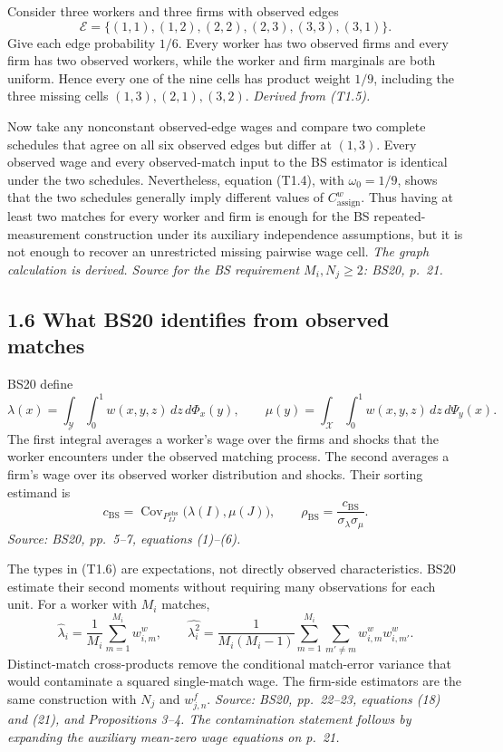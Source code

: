 \documentclass[11pt]{article}
\begin{document}
Consider three workers and three firms with observed edges
\[
\mathcal E
=\{(1,1),(1,2),(2,2),(2,3),(3,3),(3,1)\}.
\tag{T1.5}
\]
Give each edge probability \(1/6\).  Every worker has two observed firms and
every firm has two observed workers, while the worker and firm marginals are
both uniform.  Hence every one of the nine cells has product weight \(1/9\),
including the three missing cells \((1,3),(2,1),(3,2)\).
\textit{Derived from (T1.5).}

Now take any nonconstant observed-edge wages and compare two complete schedules
that agree on all six observed edges but differ at \((1,3)\).  Every observed
wage and every observed-match input to the BS estimator is identical under the
two schedules.  Nevertheless, equation (T1.4), with
\(\omega_0=1/9\), shows that the two schedules generally imply different
values of \(C^w_{\mathrm{assign}}\).  Thus having at least two matches for
every worker and firm is enough for the BS repeated-measurement construction
under its auxiliary independence assumptions, but it is not enough to recover
an unrestricted missing pairwise wage cell.
\textit{The graph calculation is derived.  Source for the BS requirement
\(M_i,N_j\geq2\): BS20, p.\ 21.}

\subsection{1.6 What BS20 identifies from observed matches}

BS20 define
\[
\lambda(x)
=\int_{\mathcal Y}\int_0^1w(x,y,z)\,dz\,d\Phi_x(y),
\qquad
\mu(y)
=\int_{\mathcal X}\int_0^1w(x,y,z)\,dz\,d\Psi_y(x).
\tag{T1.6}
\]
The first integral averages a worker's wage over the firms and shocks that the
worker encounters under the observed matching process.  The second averages a
firm's wage over its observed worker distribution and shocks.  Their sorting
estimand is
\[
c_{\mathrm{BS}}
=\operatorname{Cov}_{P^{\mathrm{obs}}_{IJ}}
\bigl(\lambda(I),\mu(J)\bigr),
\qquad
\rho_{\mathrm{BS}}
=\frac{c_{\mathrm{BS}}}{\sigma_\lambda\sigma_\mu}.
\tag{T1.7}
\]
\textit{Source: BS20, pp.\ 5--7, equations (1)--(6).}

The types in (T1.6) are expectations, not directly observed characteristics.
BS20 estimate their second moments without requiring many observations for
each unit.  For a worker with \(M_i\) matches,
\[
\widehat\lambda_i
=\frac1{M_i}\sum_{m=1}^{M_i}w^w_{i,m},
\qquad
\widehat{\lambda_i^2}
=\frac{1}{M_i(M_i-1)}
\sum_{m=1}^{M_i}\sum_{m'\ne m}
w^w_{i,m}w^w_{i,m'}.
\tag{T1.8}
\]
Distinct-match cross-products remove the conditional match-error variance that
would contaminate a squared single-match wage.  The firm-side estimators are
the same construction with \(N_j\) and \(w^f_{j,n}\).
\textit{Source: BS20, pp.\ 22--23, equations (18) and (21), and
Propositions 3--4.  The contamination statement follows by expanding the
auxiliary mean-zero wage equations on p.\ 21.}
\end{document}
